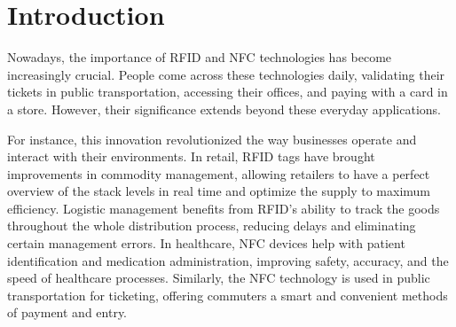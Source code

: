 \chapter*{Introduction}
\setcounter{page}{1}


Nowadays, the importance of RFID and NFC technologies has become increasingly crucial. People come across these technologies daily, validating their tickets in public transportation, accessing their offices, and paying with a card in a store. However, their significance extends beyond these everyday applications.

For instance, this innovation revolutionized the way businesses operate and interact with their environments. In retail, RFID tags have brought improvements in commodity management, allowing retailers to have a perfect overview of the stack levels in real time and optimize the supply to maximum efficiency. Logistic management benefits from RFID's ability to track the goods throughout the whole distribution process, reducing delays and eliminating certain management errors. In healthcare, NFC devices help with patient identification and medication administration, improving safety, accuracy, and the speed of healthcare processes. \cite{pirrone2012mobile} Similarly, the NFC technology is used in public transportation for ticketing, offering commuters a smart and convenient methods of payment and entry.

